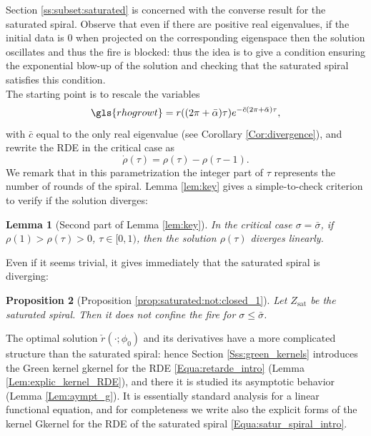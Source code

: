 \documentclass[reqno]{amsart}
\theoremstyle{definition} \newtheorem{definition}{Definition}[section]
\theoremstyle{definition} \newtheorem{remark}[definition]{Remark}
\theoremstyle{plain} \newtheorem{lemma}[definition]{Lemma}
\theoremstyle{plain} \newtheorem{proposition}[definition]{Proposition}
\theoremstyle{plain} \newtheorem{theorem}[definition]{Theorem}
\theoremstyle{plain} \newtheorem{corollary}[definition]{Corollary}
\theoremstyle{definition} \newtheorem{example}[definition]{Example}
\theoremstyle{plain} \newtheorem{claim}[clai]{Claim}
\theoremstyle{definition} \newtheorem{assumption}[definition]{Assumption}
\theoremstyle{definition} \newtheorem{observation}[definition]{Observation}
\newcommand{\1}{\mathbbm 1}
\numberwithin{equation}{section} %
\theoremstyle{plain} \newtheorem*{theorem*}{Theorem}
\theoremstyle{plain} \newtheorem{mthm}[maintheorem]{Main Theorem}
\theoremstyle{plain} \newtheorem*{mthm*}{Main Theorem}
\theoremstyle{plain} \newtheorem*{conjecture*}{Conjecture}
\theoremstyle{plain} \newtheorem{conjecture}[definition]{Conjecture}
\theoremstyle{plain} \newtheorem*{problem*}{Problem}
\begin{document}
Section \ref{ss:subset:saturated} is concerned with the converse result for the saturated spiral. Observe that even if there are positive real eigenvalues, if the initial data is $0$ when projected on the corresponding eigenspace then the solution oscillates and thus the fire is blocked: thus the idea is to give a condition ensuring the exponential blow-up of the solution and checking that the saturated spiral satisfies this condition. \\
The starting point is to rescale the variables %
\begin{equation*}
\gls{rhogrowt} = r((2\pi+\bar \alpha) \tau) e^{-\bar c (2\pi + \bar \alpha) \tau},
\end{equation*}
with $\bar c$ equal to the only real eigenvalue (see Corollary \ref{Cor:divergence}), and rewrite the RDE in the critical case as
\begin{equation}
\label{Equa:retarde_intro}
\dot \rho(\tau) = \rho(\tau) - \rho(\tau-1).
\end{equation}
We remark that in this parametrization the integer part of $\tau$ represents the number of rounds of the spiral.
Lemma \ref{lem:key} gives a simple-to-check criterion to verify if the solution diverges:

\begin{lemma}[Second part of Lemma \ref{lem:key}]
\label{lem:key_intro}
%
In the critical case $\sigma=\bar\sigma$, if $\rho(1) > \rho(\tau) > 0$, $\tau \in [0,1)$, then the solution $\rho(\tau)$ diverges linearly.
%
\end{lemma} %

Even if it seems trivial, it gives immediately that the saturated spiral is diverging:

\begin{proposition}[Proposition \ref{prop:saturated:not:closed_1}]
\label{prop:not_closed_intro}
Let $Z_{\text{sat}}$ be the saturated spiral. Then it does not confine the fire for $\sigma\leq \bar \sigma$. 
\end{proposition}

The optimal solution $\check r(\cdot;\phi_0)$ and its derivatives have a more complicated structure than the saturated spiral: hence Section \ref{Sss:green_kernels} introduces the Green kernel \gls{gkernel} for the RDE \eqref{Equa:retarde_intro} (Lemma \ref{Lem:explic_kernel_RDE}), and there it is studied its asymptotic behavior (Lemma \ref{Lem:aympt_g}). It is essentially standard analysis for a linear functional equation, and for completeness we write also the explicit forms of the kernel \gls{Gkernel} for the RDE of the saturated spiral \eqref{Equa:satur_spiral_intro}.
\end{document}
